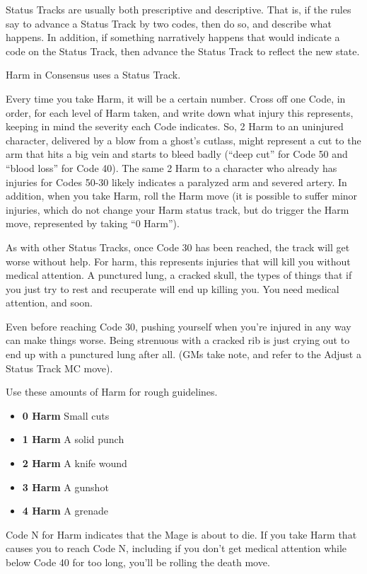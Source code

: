 \documentclass[letterpaper,12pt]{article}
\newcommand{\SECTION}[1]{\vspace{.5em}{\noindent\titlefont\large\textbf{#1}}

}
\begin{document}
Status Tracks are usually both prescriptive and descriptive. That is,
if the rules say to advance a Status Track by two codes, then do so,
and describe what happens. In addition, if something narratively
happens that would indicate a code on the Status Track, then advance
the Status Track to reflect the new state.

\SECTION{Harm}
Harm in Consensus uses a Status Track.

Every time you take Harm, it will be a certain number. Cross off one
Code, in order, for each level of Harm taken, and write down what
injury this represents, keeping in mind the severity each Code
indicates. So, 2 Harm to an uninjured character, delivered by a blow
from a ghost's cutlass, might represent a cut to the arm that hits a
big vein and starts to bleed badly (``deep cut'' for Code 50 and
``blood loss'' for Code 40). The same 2 Harm to a character who
already has injuries for Codes 50-30 likely indicates a paralyzed arm
and severed artery. In addition, when you take Harm, roll the Harm
move (it is possible to suffer minor injuries, which do not change
your Harm status track, but do trigger the Harm move, represented by
taking ``0 Harm'').

As with other Status Tracks, once Code 30 has been reached, the track
will get worse without help. For harm, this represents injuries that
will kill you without medical attention. A punctured lung, a cracked
skull, the types of things that if you just try to rest and recuperate
will end up killing you. You need medical attention, and soon.

Even before reaching Code 30, pushing yourself when you're injured in
any way can make things worse. Being strenuous with a cracked rib is
just crying out to end up with a punctured lung after all. (GMs take
note, and refer to the Adjust a Status Track MC move).

Use these amounts of Harm for rough guidelines.

\begin{itemize}
  \setlength{\itemsep}{0em}
\item \textbf{0 Harm} Small cuts
\item \textbf{1 Harm} A solid punch
\item \textbf{2 Harm} A knife wound
\item \textbf{3 Harm} A gunshot
\item \textbf{4 Harm} A grenade
\end{itemize}

Code N for Harm indicates that the Mage is about to die. If you take
Harm that causes you to reach Code N, including if you don't get
medical attention while below Code 40 for too long, you'll be rolling
the death move.
\end{document}
